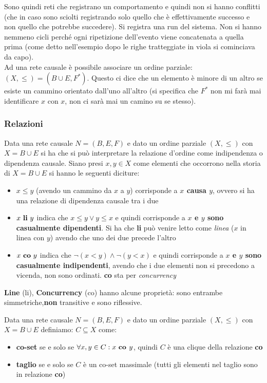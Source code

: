 Sono quindi reti che registrano un comportamento e quindi non si hanno conflitti (che in caso sono sciolti registrando solo quello che è effettivamente successo e non quello che potrebbe succedere). Si registra una run del sistema. Non si hanno nemmeno cicli perché ogni ripetizione dell'evento viene concatenata a quella prima (come detto nell'esempio dopo le righe tratteggiate in viola si cominciava da capo).\\ 
 
Ad una rete causale è possibile associare un ordine parziale: $(X,\leq)=(B\cup E, F^*)$. Questo ci dice che un elemento è minore di un altro se esiste un cammino orientato dall'uno all'altro (si specifica che $F^*$ non mi farà mai identificare $x$ con $x$, non ci sarà mai un camino su se stesso).

\subsubsection{Relazioni}
Data una rete causale $N=(B,E,F)$ e dato un ordine parziale $(X, \leq)$ con $X=B\cup E$ si ha che si può interpretare la relazione d'ordine come indipendenza o dipendenza causale.
Siano presi $x,y\in X$ come elementi che occorrono nella storia di $X=B\cup E$ si hanno le seguenti diciture: 
\begin{itemize} 
    \item $x\leq y$ (avendo un cammino da $x$ a $y$) corrisponde a \textbf{$x$ causa $y$}, ovvero si ha una relazione di dipendenza causale tra i due 
    \item $x \mbox{ \textbf{li} }y$ indica che $x\leq y\lor y\leq x$ e quindi corrisponde a \textbf{$x$ e $y$ sono casualmente dipendenti}. Si ha che \textbf{li} può venire letto come \textit{linea} ($x$ in linea con $y$) avendo che uno dei due precede l'altro 
    \item $x \mbox{ \textbf{co} }y$ indica che $\neg(x< y)\land \neg(y < x)$ e quindi corrisponde a \textbf{$x$ e $y$ sono casualmente indipendenti}, avendo che i due elementi non si precedono a vicenda, non sono ordinati. \textbf{co} sta per \textit{concurrency} 
\end{itemize}

\textbf{Line} (li), \textbf{Concurrency} (co) hanno alcune proprietà: sono entrambe simmetriche,\textbf{non} transitive e sono riflessive.

Data una rete causale $N=(B,E,F)$ e dato un ordine parziale $(X, \leq)$ con $X=B\cup E$ definiamo: $C\subseteq X$ come:
\begin{itemize}
    \item \textbf{co-set}  se e solo se $\forall x,y\in C:  x\mbox{ \textbf{co }}y$, quindi $C$ è una clique della relazione \textbf{co}
    \item \textbf{taglio}  se e solo se $C$ è un co-set massimale (tutti gli elementi nel taglio sono in relazione \textbf{co})
\end{itemize}

